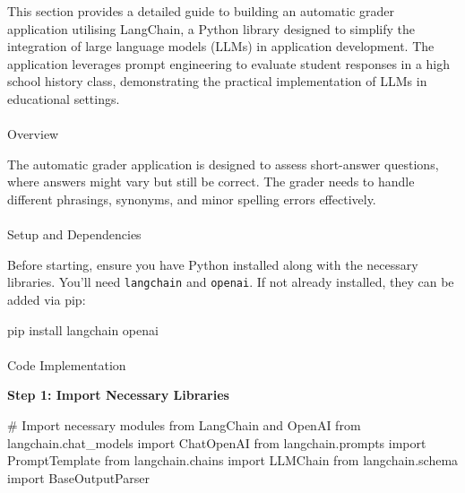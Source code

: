 \documentclass[
]{agujournal2019}
\makeatletter
\let\oldparagraph\paragraph
\renewcommand{\paragraph}{
    \@ifstar
      \xxxParagraphStar
      \xxxParagraphNoStar
  }
\newcommand{\xxxParagraphStar}[1]{\oldparagraph*{#1}\mbox{}}
\newcommand{\xxxParagraphNoStar}[1]{\oldparagraph{#1}\mbox{}}
\newenvironment{Shaded}{\begin{snugshade}}{\end{snugshade}}
\newcommand{\CommentTok}[1]{\textcolor[rgb]{0.37,0.37,0.37}{#1}}
\newcommand{\ExtensionTok}[1]{\textcolor[rgb]{0.00,0.23,0.31}{#1}}
\newcommand{\ImportTok}[1]{\textcolor[rgb]{0.00,0.46,0.62}{#1}}
\newcommand{\NormalTok}[1]{\textcolor[rgb]{0.00,0.23,0.31}{#1}}
\makeatother
\begin{document}
This section provides a detailed guide to building an automatic grader
application utilising LangChain, a Python library designed to simplify
the integration of large language models (LLMs) in application
development. The application leverages prompt engineering to evaluate
student responses in a high school history class, demonstrating the
practical implementation of LLMs in educational settings.

\paragraph{Overview}\label{overview}

The automatic grader application is designed to assess short-answer
questions, where answers might vary but still be correct. The grader
needs to handle different phrasings, synonyms, and minor spelling errors
effectively.

\paragraph{Setup and Dependencies}\label{setup-and-dependencies}

Before starting, ensure you have Python installed along with the
necessary libraries. You'll need \texttt{langchain} and \texttt{openai}.
If not already installed, they can be added via pip:

\begin{Shaded}
\begin{Highlighting}[]
\ExtensionTok{pip}\NormalTok{ install langchain openai}
\end{Highlighting}
\end{Shaded}

\paragraph{Code Implementation}\label{code-implementation}

\textbf{Step 1: Import Necessary Libraries}

\begin{Shaded}
\begin{Highlighting}[]
\CommentTok{\# Import necessary modules from LangChain and OpenAI}
\ImportTok{from}\NormalTok{ langchain.chat\_models }\ImportTok{import}\NormalTok{ ChatOpenAI}
\ImportTok{from}\NormalTok{ langchain.prompts }\ImportTok{import}\NormalTok{ PromptTemplate}
\ImportTok{from}\NormalTok{ langchain.chains }\ImportTok{import}\NormalTok{ LLMChain}
\ImportTok{from}\NormalTok{ langchain.schema }\ImportTok{import}\NormalTok{ BaseOutputParser}
\end{Highlighting}
\end{Shaded}
\end{document}
